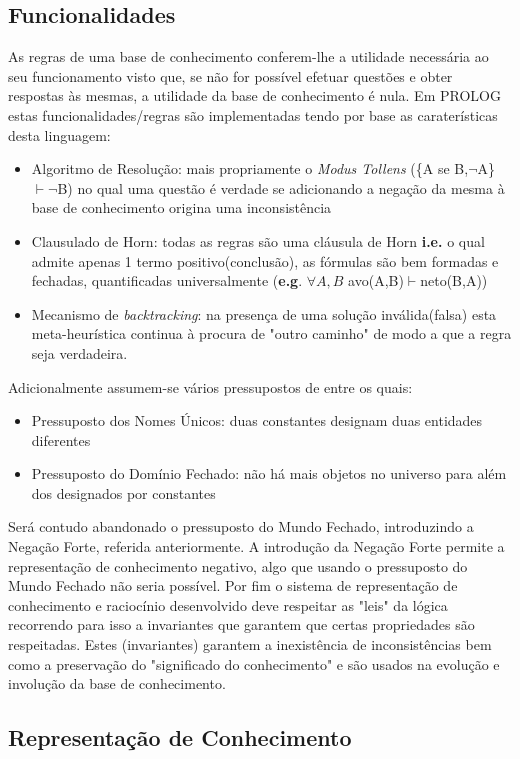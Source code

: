 \documentclass{article}
\begin{document}
\subsection{Funcionalidades}
As regras de uma base de conhecimento conferem-lhe a utilidade necessária ao seu funcionamento visto que, se não for possível efetuar questões e obter respostas às mesmas, a utilidade da base de conhecimento é nula. Em PROLOG estas funcionalidades/regras são implementadas tendo por base as caraterísticas desta linguagem:
\begin{itemize} 
	\item Algoritmo de Resolução: mais propriamente o \textit{Modus Tollens} (\{A se B,$\neg$A\}$\vdash\neg$B) no qual uma questão é verdade se adicionando a negação da mesma à base de conhecimento origina uma inconsistência
    \item Clausulado de Horn: todas as regras são uma cláusula de Horn \textbf{i.e.} o qual admite apenas 1 termo positivo(conclusão), as fórmulas são bem formadas e fechadas, quantificadas universalmente (\textbf{e.g}. $\forall{A,B}$ avo(A,B)$\vdash$neto(B,A))
    \item Mecanismo de \textit{backtracking}: na presença de uma solução inválida(falsa) esta meta-heurística continua à procura de "outro caminho" de modo a que a regra seja verdadeira.
\end{itemize}
Adicionalmente assumem-se vários pressupostos de entre os quais:
\begin{itemize}
	\item Pressuposto dos Nomes Únicos: duas constantes designam duas entidades diferentes
    \item Pressuposto do Domínio Fechado: não há mais objetos no universo para além dos designados por constantes
\end{itemize}
Será contudo abandonado o pressuposto do Mundo Fechado, introduzindo a Negação Forte, referida anteriormente. A introdução da Negação Forte permite a representação de conhecimento negativo, algo que usando o pressuposto do Mundo Fechado não seria possível.
Por fim o sistema de representação de conhecimento e raciocínio desenvolvido deve respeitar as "leis" da lógica recorrendo para isso a invariantes que garantem que certas propriedades são respeitadas. Estes (invariantes) garantem a inexistência de inconsistências bem como a preservação do "significado do conhecimento" e são usados na evolução e involução da base de conhecimento.

\subsection{Representação de Conhecimento}
\end{document}

